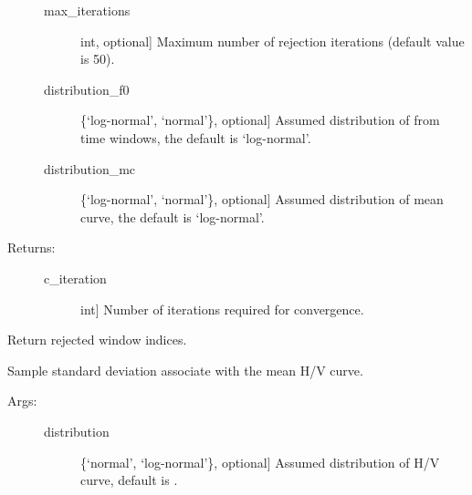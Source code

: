 \documentclass[letterpaper,10pt,english,openany,oneside]{sphinxmanual}
\begin{document}
\begin{fulllineitems}
\begin{fulllineitems}
\begin{description}
\begin{description}
\item[{max\_iterations}] \leavevmode{[}int, optional{]}
Maximum number of rejection iterations (default value is
50).

\item[{distribution\_f0}] \leavevmode{[}\{‘log-normal’, ‘normal’\}, optional{]}
Assumed distribution of  from time windows, the
default is ‘log-normal’.

\item[{distribution\_mc}] \leavevmode{[}\{‘log-normal’, ‘normal’\}, optional{]}
Assumed distribution of mean curve, the default is
‘log-normal’.

\end{description}

\item[{Returns:}] \leavevmode\begin{description}
\item[{c\_iteration}] \leavevmode{[}int{]}
Number of iterations required for convergence.

\end{description}

\end{description}

\end{fulllineitems}


\begin{fulllineitems}
\label{\detokenize{index:hvsrpy.Hvsr.rejected_window_indices}}
Return rejected window indices.

\end{fulllineitems}


\begin{fulllineitems}
\label{\detokenize{index:hvsrpy.Hvsr.std_curve}}
Sample standard deviation associate with the mean H/V curve.
\begin{description}
\item[{Args:}] \leavevmode\begin{description}
\item[{distribution}] \leavevmode{[}\{‘normal’, ‘log-normal’\}, optional{]}
Assumed distribution of H/V curve, default is
.


\end{description}
\end{description}
\end{fulllineitems}
\end{fulllineitems}
\end{document}
